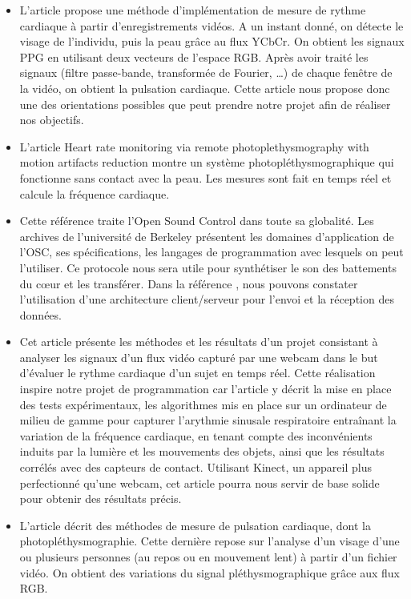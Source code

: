 \documentclass[12pt,a4paper]{article}
\begin{document}
\begin{itemize}
\item L'article \cite{Ufuk} propose une méthode d'implémentation de mesure de rythme cardiaque à partir d'enregistrements vidéos. A un instant donné, on détecte le visage de l'individu, puis la peau grâce au flux YCbCr. On obtient les signaux PPG en utilisant deux vecteurs de l'espace RGB. Après avoir traité les signaux (filtre passe-bande, transformée de Fourier, …) de chaque fenêtre de la vidéo, on obtient la pulsation cardiaque. Cette article nous propose donc une des orientations possibles que peut prendre notre projet afin de réaliser nos objectifs.
\newline
\item L'article \cite{Cenn} Heart rate monitoring via remote photoplethysmography with motion artifacts reduction montre un système photopléthysmographique qui fonctionne sans contact avec la peau. Les mesures sont fait en temps réel et calcule la fréquence cardiaque.
\newpage
\item Cette référence\cite{Wri03} traite l'Open Sound Control dans toute sa globalité. Les archives de l'université de Berkeley  présentent les domaines d'application de l'OSC, ses spécifications, les langages de programmation avec lesquels on peut l'utiliser. Ce protocole nous sera utile pour synthétiser le son des battements du cœur et les transférer. Dans la référence \cite{Wri03}, nous pouvons constater l'utilisation d'une architecture client/serveur pour l'envoi et la réception des données. 
\item Cet article \cite{Bous} présente les méthodes et les résultats d'un projet consistant à analyser les signaux d'un flux vidéo capturé par une webcam dans le but d'évaluer le rythme cardiaque d'un sujet en temps réel. Cette réalisation inspire notre projet de programmation car l'article y décrit la mise en place des tests expérimentaux, les algorithmes mis en place sur un ordinateur de milieu de gamme pour capturer l'arythmie sinusale respiratoire entraînant la variation de la fréquence cardiaque, en tenant compte des inconvénients induits par la lumière et les mouvements des objets, ainsi que les résultats corrélés avec des capteurs de contact.
Utilisant Kinect, un appareil plus perfectionné qu'une webcam, cet article pourra nous servir de base solide pour obtenir des résultats précis.
\newline
\item L'article \cite{Kran} décrit des méthodes de mesure de pulsation cardiaque, dont la photopléthysmographie. Cette dernière repose sur l'analyse d'un visage d'une ou plusieurs personnes (au repos ou en mouvement lent) à partir d'un fichier vidéo. On obtient des variations du signal pléthysmographique grâce aux flux RGB.

\end{itemize}
\end{document}

